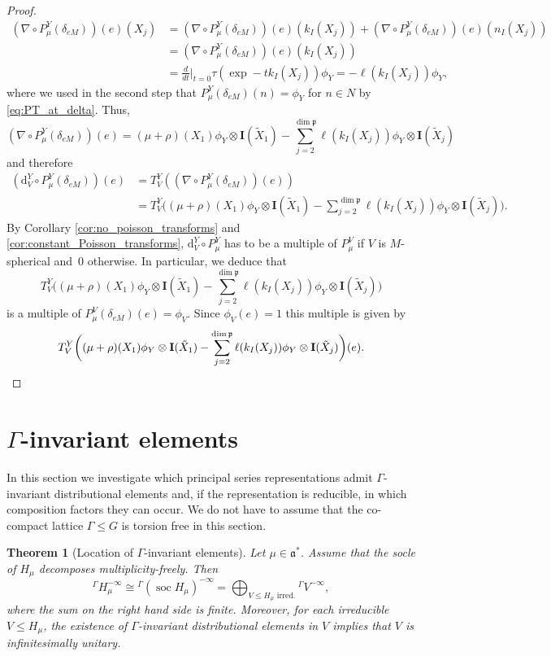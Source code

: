 \documentclass[JEP,XML,SOM,NoFloatCountersInSection,Unicode,published]{cedram}
\newcommand{\Ga}{{}^\Gamma\!}
\newtheorem{theorem}{Theorem}[section]
\theoremstyle{definition}
\renewcommand{\d}[1][t]{\ensuremath{\frac{d}{d#1}\Big|_{#1=0}}}
\newcommand{\mf}[1]{\ensuremath{\mathfrak{#1}}}
\newcommand{\on}[1]{\ensuremath{\operatorname{#1}}}
\newcommand{\rhoa}{\ensuremath{\rho}}
\newcommand{\ps}[2]{\ensuremath{H_{#2}}}
\newcommand{\psd}[2]{\ensuremath{H_{#2}^{-\infty}}}
\newcommand{\I}{\ensuremath{\mathbf{I}}}
\newcommand{\Ik}[1]{\ensuremath{k_I(#1)}}
\newcommand{\In}[1]{\ensuremath{n_I(#1)}}
\begin{document}
\begin{proof}
\begin{align*}
(\nabla\circ P_\mu^{Y}(\delta_{eM}))(e)(X_j)&=(\nabla\circ P_\mu^{Y}(\delta_{eM}))(e)(\Ik{X_j})
+(\nabla\circ P_\mu^{Y}(\delta_{eM}))(e)(\In{X_j})\\
&=(\nabla\circ P_\mu^{Y}(\delta_{eM}))(e)(\Ik{X_j})\\
&=\d\tau(\exp-t\Ik{X_j})\phi_Y=-\ell(\Ik{X_j})\phi_Y,
\end{align*}
where we used in the second step that $P_\mu^{Y}(\delta_{eM})(n)=\phi_Y$ for $n\in N$ by \eqref{eq:PT_at_delta}. Thus,
\[
(\nabla\circ P_\mu^{Y}(\delta_{eM}))(e)=(\mu+\rhoa)(X_1)\phi_Y\otimes\I(\tilde X_1)-\sum_{j=2}^{\dim\mf p}\ell(\Ik{X_j})\phi_Y\otimes\I(\tilde X_j)
\]
and therefore
\begin{align*}
(\mathrm{d}_V^Y\circ P_\mu^{Y}(\delta_{eM}))(e)&=T_V^Y((\nabla\circ P_\mu^{Y}(\delta_{eM}))(e))\\
&=T_V^Y\biggl((\mu+\rhoa)(X_1)\phi_Y\otimes\I(\tilde X_1)-\sum_{j=2}^{\dim\mf p}\ell(\Ik{X_j})\phi_Y\otimes\I(\tilde X_j)
\biggr).
\end{align*}
By Corollary \ref{cor:no_poisson_transforms} and \ref{cor:constant_Poisson_transforms}, $\mathrm{d}_V^Y\circ P_\mu^{Y}$ has to be a multiple of $P_\mu^{V}$ if $V$ is $M$-spherical and~$0$ otherwise. In particular, we deduce that\vspace*{-3pt}
\[
T_V^Y\biggl((\mu+\rhoa)(X_1)\phi_Y\otimes\I(\tilde X_1)-\sum_{j=2}^{\dim\mf p}\ell(\Ik{X_j})\phi_Y\otimes\I(\tilde X_j)\biggr)
\]
is a multiple of $P_\mu^{V}(\delta_{eM})(e)=\phi_V$. Since $\phi_V(e)=1$ this multiple is given by\vspace*{-3pt}\enlargethispage{.5\baselineskip}
\[
T_V^Y\biggl((\mu+\rhoa)(X_1)\phi_Y\otimes\I(\tilde X_1)-\sum_{j=2}^{\dim\mf p}\ell(\Ik{X_j})\phi_Y\otimes\I(\tilde X_j)\biggr)(e).\qedhere
\]
\end{proof}

\section{\texorpdfstring{$\Gamma$-invariant elements}{Gamma-invariant elements}}\label{sec:Gamma_inv}
In this section we investigate which principal series representations admit $\Gamma$\nobreakdash-invari\-ant distributional elements and, if the representation is reducible, in which composition factors they can occur. We do not have to assume that the co-compact lattice $\Gamma\leq G$ is torsion free in this section.

\begin{theorem}[Location of $\Gamma$-invariant elements]\label{thm:Gamma_inv_ps}
Let $\mu\in\mf a^*$. Assume that the socle of $\ps{\sigma}{\mu}$ decomposes multiplicity-freely. Then\vspace*{-3pt}
\[
\Ga\psd{\sigma}{\mu}\cong\Ga(\on{soc}\ps{\sigma}{\mu})^{-\infty}=\bigoplus_{V\leq\ps{\sigma}{\mu}\text{ irred.}}{}\Ga V^{-\infty},
\]
where the sum on the right hand side is finite. Moreover, for each irreducible $V\leq\ps{\sigma}{\mu}$, the existence of $\Gamma$-invariant distributional elements in $V$ implies that $V$ is infinitesimally unitary.
\end{theorem}
\end{document}
